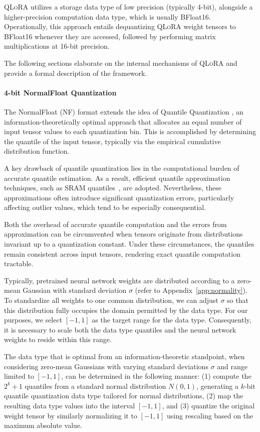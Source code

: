 \textsc{QLoRA} utilizes a storage data type of low precision (typically 4-bit), alongside a higher-precision computation data type, which is usually BFloat16. Operationally, this approach entails dequantizing \textsc{QLoRA} weight tensors to BFloat16 whenever they are accessed, followed by performing matrix multiplications at 16-bit precision.

The following sections elaborate on the internal mechanisms of \textsc{QLoRA} and provide a formal description of the framework.

\paragraph{4-bit NormalFloat Quantization} The NormalFloat (NF) format extends the idea of Quantile Quantization \citep{dettmers2022optimizers}, an information-theoretically optimal approach that allocates an equal number of input tensor values to each quantization bin. This is accomplished by determining the quantile of the input tensor, typically via the empirical cumulative distribution function.

A key drawback of quantile quantization lies in the computational burden of accurate quantile estimation. As a result, efficient quantile approximation techniques, such as SRAM quantiles~\citep{dettmers2022optimizers}, are adopted. Nevertheless, these approximations often introduce significant quantization errors, particularly affecting outlier values, which tend to be especially consequential.

Both the overhead of accurate quantile computation and the errors from approximation can be circumvented when tensors originate from distributions invariant up to a quantization constant. Under these circumstances, the quantiles remain consistent across input tensors, rendering exact quantile computation tractable.

Typically, pretrained neural network weights are distributed according to a zero-mean Gaussian with standard deviation $\sigma$ (refer to Appendix~\ref{app:normality}). To standardize all weights to one common distribution, we can adjust $\sigma$ so that this distribution fully occupies the domain permitted by the data type. For our purposes, we select $[-1, 1]$ as the target range for the data type. Consequently, it is necessary to scale both the data type quantiles and the neural network weights to reside within this range.

The data type that is optimal from an information-theoretic standpoint, when considering zero-mean Gaussians with varying standard deviations $\sigma$ and range limited to $[-1, 1]$, can be determined in the following manner: (1) compute the $2^k+1$ quantiles from a standard normal distribution $N(0, 1)$, generating a $k$-bit quantile quantization data type tailored for normal distributions, (2) map the resulting data type values into the interval $[-1, 1]$, and (3) quantize the original weight tensor by similarly normalizing it to $[-1, 1]$ using rescaling based on the maximum absolute value.

